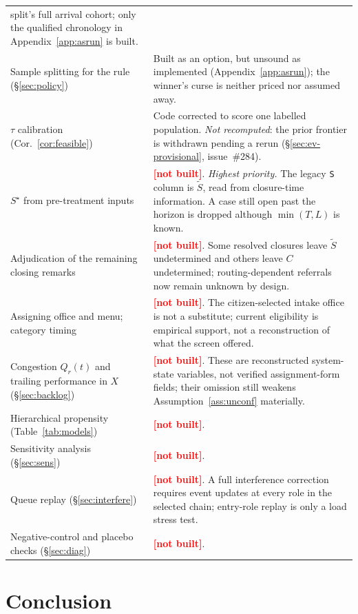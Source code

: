 \documentclass[11pt,a4paper]{article}
\theoremstyle{plain}
\theoremstyle{definition}
\theoremstyle{remark}
\newcommand{\code}[1]{\texttt{\small #1}}
\newcommand{\notbuilt}{\textcolor{red}{\textbf{[not built]}}}
\newcommand{\Sstar}{S^{\star}}
\newcommand{\Sproxy}{\widetilde S}
\begin{document}
\begin{longtable}{p{5.8cm}p{7.8cm}}
split's full arrival cohort; only the qualified chronology in Appendix~\ref{app:asrun} is built.\\
Sample splitting for the rule (\S\ref{sec:policy}) & Built as an option, but unsound as implemented (Appendix~\ref{app:asrun}); the winner's curse is neither priced nor assumed away.\\
$\tau$ calibration (Cor.~\ref{cor:feasible}) & Code corrected to score one labelled population. \emph{Not recomputed}: the prior frontier is withdrawn pending a rerun (\S\ref{sec:ev-provisional}, issue~\#284).\\
\midrule
$\Sstar$ from pre-treatment inputs & \notbuilt. \emph{Highest priority.} The legacy \code{S} column is $\Sproxy$, read from closure-time information. A case still open past the horizon is dropped although $\min(T,L)$ is known.\\
Adjudication of the remaining closing remarks & \notbuilt. Some resolved closures leave $\Sproxy$ undetermined and others leave $C$ undetermined; routing-dependent referrals now remain unknown by design.\\
Assigning office and menu; category timing & \notbuilt. The
citizen-selected intake office is not a substitute; current eligibility is empirical support,
not a reconstruction of what the screen offered.\\
Congestion $Q_r(t)$ and trailing performance in $X$ (\S\ref{sec:backlog}) & \notbuilt. These are
reconstructed system-state variables, not verified assignment-form fields; their omission still
weakens Assumption~\ref{ass:unconf} materially.\\
Hierarchical propensity (Table~\ref{tab:models}) & \notbuilt.\\
Sensitivity analysis (\S\ref{sec:sens}) & \notbuilt.\\
Queue replay (\S\ref{sec:interfere}) & \notbuilt. A full interference correction requires
event updates at every role in the selected chain; entry-role replay is only a load stress test.\\
Negative-control and placebo checks (\S\ref{sec:diag}) & \notbuilt.\\
\bottomrule
\end{longtable}

\section{Conclusion}\label{sec:conc}
\end{document}
